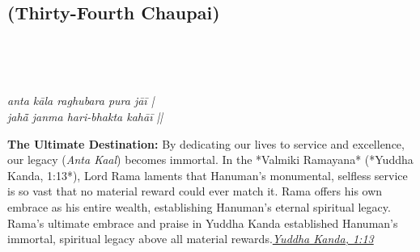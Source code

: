 
\newpage

\subsection*{ (Thirty-Fourth Chaupai)}

\begin{minipage}[t]{0.55\textwidth}
\vspace{0pt}

{\large \linespread{1.5}\selectfont
{}\\
\par}

\vspace{0.5em}

{\large \linespread{1.5}\selectfont
{}\\
\par}

\vspace{0.5em}

{\large \linespread{1.3}\selectfont
\textit{anta kāla raghubara pura jāī |}\\
\textit{jahā̃ janma hari-bhakta kahāī ||}
\par}
\end{minipage}%
\hfill
\begin{minipage}[t]{0.42\textwidth}
\vspace{0pt}
\begin{tcolorbox}[anchorbox]
\textbf{The Ultimate Destination:} By dedicating our lives to service and excellence, our legacy (\textit{Anta Kaal}) becomes immortal. In the *Valmiki Ramayana* (*Yuddha Kanda, 1:13*), Lord Rama laments that Hanuman's monumental, selfless service is so vast that no material reward could ever match it. Rama offers his own embrace as his entire wealth, establishing Hanuman's eternal spiritual legacy.
\vspace{0.5em}\newline Rama's ultimate embrace and praise in Yuddha Kanda established Hanuman's immortal, spiritual legacy above all material rewards.\newline\null\hfill\href{https://www.valmiki.iitk.ac.in/sloka?field_kanda_tid=6&language=dv&field_sarga_value=1}{\textit{Yuddha Kanda, 1:13}}
\end{tcolorbox}
\end{minipage}

